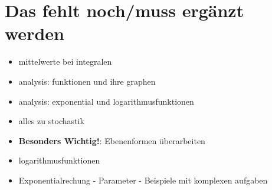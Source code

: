 \chapter{Das fehlt noch/muss ergänzt werden}
\begin{itemize}
    \item mittelwerte bei integralen
    \item analysis: funktionen und ihre graphen
    \item analysis: exponential und logarithmusfunktionen
    \item alles zu stochastik
    \item \textbf{Besonders Wichtig!}: Ebenenformen überarbeiten 
    \item logarithmusfunktionen
    \item Exponentialrechung - Parameter - Beispiele mit komplexen aufgaben
\end{itemize}
